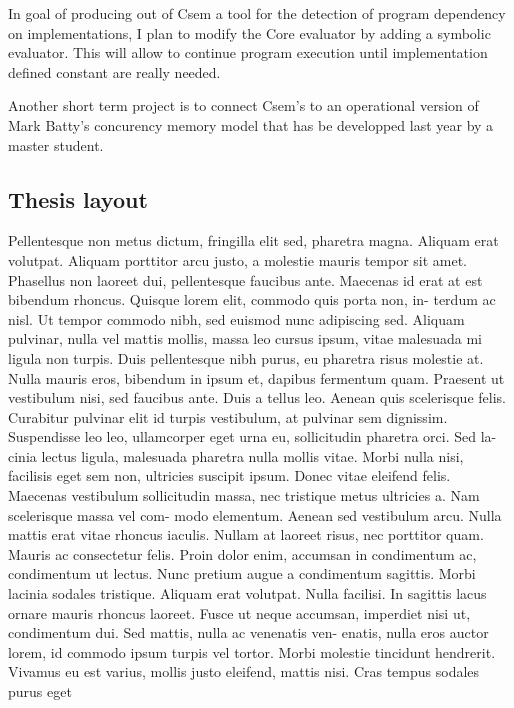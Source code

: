 \documentclass[11pt,a4paper,twocolumn]{article}
\begin{document}
In goal of producing out of Csem a tool for the detection of program
dependency on implementations, I plan to modify the Core evaluator by
adding a symbolic evaluator. This will allow to continue program
execution until implementation defined constant are really needed.

Another short term project is to connect Csem's to an operational
version of Mark Batty's concurency memory model that has be developped
last year by a master student.


\subsection*{Thesis layout}

{\color{red} Pellentesque non metus dictum, fringilla elit sed,
  pharetra magna. Aliquam erat volutpat. Aliquam porttitor arcu justo,
  a molestie mauris tempor sit amet. Phasellus non laoreet dui,
  pellentesque faucibus ante. Maecenas id erat at est bibendum
  rhoncus. Quisque lorem elit, commodo quis porta non, in- terdum ac
  nisl. Ut tempor commodo nibh, sed euismod nunc adipiscing
  sed. Aliquam pulvinar, nulla vel mattis mollis, massa leo cursus
  ipsum, vitae malesuada mi ligula non turpis. Duis pellentesque nibh
  purus, eu pharetra risus molestie at. Nulla mauris eros, bibendum in
  ipsum et, dapibus fermentum quam. Praesent ut vestibulum nisi, sed
  faucibus ante. Duis a tellus leo.  Aenean quis scelerisque
  felis. Curabitur pulvinar elit id turpis vestibulum, at pulvinar sem
  dignissim. Suspendisse leo leo, ullamcorper eget urna eu,
  sollicitudin pharetra orci. Sed la- cinia lectus ligula, malesuada
  pharetra nulla mollis vitae. Morbi nulla nisi, facilisis eget sem
  non, ultricies suscipit ipsum. Donec vitae eleifend felis. Maecenas
  vestibulum sollicitudin massa, nec tristique metus ultricies a. Nam
  scelerisque massa vel com- modo elementum. Aenean sed vestibulum
  arcu. Nulla mattis erat vitae rhoncus iaculis. Nullam at laoreet
  risus, nec porttitor quam. Mauris ac consectetur felis. Proin dolor
  enim, accumsan in condimentum ac, condimentum ut lectus. Nunc
  pretium augue a condimentum sagittis. Morbi lacinia sodales
  tristique.  Aliquam erat volutpat. Nulla facilisi. In sagittis lacus
  ornare mauris rhoncus laoreet. Fusce ut neque accumsan, imperdiet
  nisi ut, condimentum dui. Sed mattis, nulla ac venenatis ven-
  enatis, nulla eros auctor lorem, id commodo ipsum turpis vel
  tortor. Morbi molestie tincidunt hendrerit. Vivamus eu est varius,
  mollis justo eleifend, mattis nisi. Cras tempus sodales purus eget
}
\end{document}

